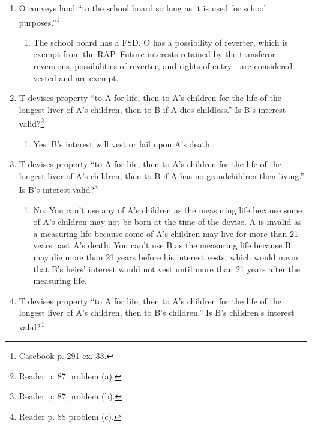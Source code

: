 \begin{enumerate}
{    problem 4). See reader p. 74.}
    \begin{enumerate}
        \item Yes. B has a vested remainder in fee simple absolute. The RAP 
        only applies to non-vested interests.
    \end{enumerate}
    \item O conveys land ``to the school board so long as it is used for 
    school purposes.''\footnote{Casebook p. 291 ex. 33.}
    \begin{enumerate}
        \item The school board has a FSD. O has a possibility of reverter, 
        which is exempt from the RAP. Future interests retained by the 
        transferor---reversions, possibilities of reverter, and rights of 
        entry---are considered vested and are exempt.
    \end{enumerate}
    \item T devises property ``to A for life, then to A's children for the 
    life of the longest liver of A's children, then to B if A dies 
    childless.'' Is B's interest valid?\footnote{Reader p. 87 problem (a).}
    \begin{enumerate}
        \item Yes. B's interest will vest or fail upon A's death.
    \end{enumerate}
    \item T devises property ``to A for life, then to A's children for the 
    life of the longest liver of A's children, then to B if A has no 
    grandchildren then living.'' Is B's interest valid?\footnote{Reader p. 87 
    problem (b).}
    \begin{enumerate}
        \item No. You can't use any of A's children as the measuring life 
        because some of A's children may not be born at the time of the 
        devise. A is invalid as a measuring life because some of A's children 
        may live for more than 21 years past A's death. You can't use B as the 
        measuring life because B may die more than 21 years before his 
        interest vests, which would mean that B's heirs' interest would not 
        vest until more than 21 years after the measuring life.
    \end{enumerate}
    \item T devises property ``to A for life, then to A's children for the 
    life of the longest liver of A's children, then to B's children.'' Is B's 
    children's interest valid?\footnote{Reader p. 88 problem (c).}

\end{enumerate}
